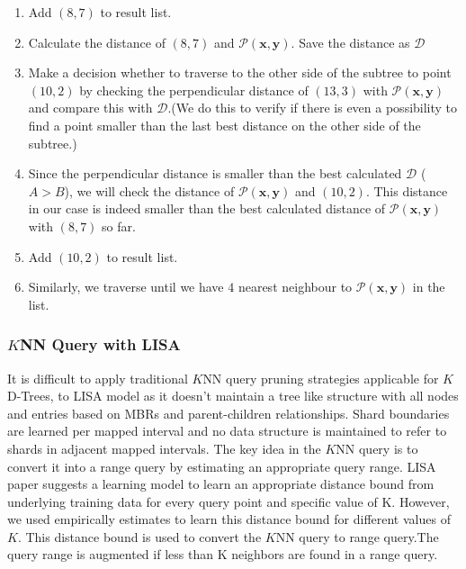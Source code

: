 \begin{mscexample}
\begin{enumerate}
    	\item Add $(8,7)$ to result list.
    	
    	\item Calculate the distance of $(8,7)$ and $\mathcal{P}(\boldsymbol{x}, \boldsymbol{y})$. Save the distance as $\mathcal{D}$
    	
    	\item Make a decision whether to traverse to the other side of the subtree to point $(10,2)$ by checking the perpendicular distance of $(13,3)$ with $\mathcal{P}(\boldsymbol{x}, \boldsymbol{y})$ and compare this with $\mathcal{D}$.(We do this to verify if there is even a possibility to find a point smaller than the last best distance on the other side of the subtree.) 
    	
    	\item Since the perpendicular distance is smaller than the best calculated $\mathcal{D}$ ($A > B$), we will check the distance of $\mathcal{P}(\boldsymbol{x}, \boldsymbol{y})$ and $(10,2)$. This distance in our case is indeed smaller than the best calculated distance of $\mathcal{P}(\boldsymbol{x}, \boldsymbol{y})$ with $(8,7)$ so far.
    	
    	\item Add $(10,2)$ to result list.
    	
    	\item Similarly, we traverse until we have $4$ nearest neighbour to $\mathcal{P}(\boldsymbol{x}, \boldsymbol{y})$ in the list.
	\end{enumerate}
\end{mscexample}



\subsubsection{$K$NN Query with LISA}
It is difficult to apply traditional $K$NN query pruning strategies applicable for $K$D-Trees, to LISA model as it doesn't maintain a tree like structure with all nodes and
entries based on MBRs and parent-children relationships. Shard boundaries are learned per mapped interval and no data structure is maintained to refer to shards in adjacent mapped intervals. The key idea in the $K$NN query is to convert it into a range query by estimating an appropriate query range. LISA paper suggests a learning model to learn an appropriate distance bound from underlying training data for every query point and specific value of K. However, we used empirically estimates to learn this distance bound for different values of $K$. This distance bound is used to convert the $K$NN query to range query.The query range is augmented if less than K neighbors are found in a range query. 

